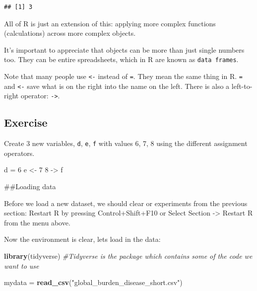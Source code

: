 \documentclass[]{book}
\makeatletter
\newenvironment{Shaded}{\begin{snugshade}}{\end{snugshade}}
\newcommand{\CommentTok}[1]{\textcolor[rgb]{0.56,0.35,0.01}{\textit{#1}}}
\newcommand{\DecValTok}[1]{\textcolor[rgb]{0.00,0.00,0.81}{#1}}
\newcommand{\KeywordTok}[1]{\textcolor[rgb]{0.13,0.29,0.53}{\textbf{#1}}}
\newcommand{\NormalTok}[1]{#1}
\newcommand{\StringTok}[1]{\textcolor[rgb]{0.31,0.60,0.02}{#1}}
\newenvironment{kframe}{%
\medskip{}
\setlength{\fboxsep}{.8em}
 \def\at@end@of@kframe{}%
 \ifinner\ifhmode%
  \def\at@end@of@kframe{\end{minipage}}%
  \begin{minipage}{\columnwidth}%
 \fi\fi%
 \def\FrameCommand##1{\hskip\@totalleftmargin \hskip-\fboxsep
 \colorbox{shadecolor}{##1}\hskip-\fboxsep
     \hskip-\linewidth \hskip-\@totalleftmargin \hskip\columnwidth}%
 \MakeFramed {\advance\hsize-\width
   \@totalleftmargin\z@ \linewidth\hsize
   \@setminipage}}%
 {\par\unskip\endMakeFramed%
 \at@end@of@kframe}
\renewenvironment{Shaded}{\begin{kframe}}{\end{kframe}}
\theoremstyle{definition}
\theoremstyle{definition}
\theoremstyle{definition}
\theoremstyle{remark}
\makeatother
\begin{document}
\begin{verbatim}
## [1] 3
\end{verbatim}

All of R is just an extension of this: applying more complex functions
(calculations) across more complex objects.

It's important to appreciate that objects can be more than just single
numbers too. They can be entire spreadsheets, which in R are known as
\texttt{data\ frames}.

Note that many people use \texttt{\textless{}-} instead of \texttt{=}.
They mean the same thing in R. \texttt{=} and \texttt{\textless{}-} save
what is on the right into the name on the left. There is also a
left-to-right operator: \texttt{-\textgreater{}}.

\hypertarget{exercise-3}{%
\subsection{Exercise}\label{exercise-3}}

Create 3 new variables, \texttt{d}, \texttt{e}, \texttt{f} with values
6, 7, 8 using the different assignment operators.

\begin{Shaded}
\begin{Highlighting}[]
\NormalTok{d  =}\StringTok{ }\DecValTok{6}
\NormalTok{e <-}\StringTok{ }\DecValTok{7}
\DecValTok{8}\NormalTok{ ->}\StringTok{ }\NormalTok{f}
\end{Highlighting}
\end{Shaded}

\#\#Loading data

Before we load a new dataset, we should clear or experiments from the
previous section: Restart R by pressing Control+Shift+F10 or Select
Section -\textgreater{} Restart R from the menu above.

Now the environment is clear, lets load in the data:

\begin{Shaded}
\begin{Highlighting}[]
\KeywordTok{library}\NormalTok{(tidyverse) }\CommentTok{#Tidyverse is the package which contains some of the code we want to use}

\NormalTok{mydata =}\StringTok{ }\KeywordTok{read_csv}\NormalTok{(}\StringTok{"global_burden_disease_short.csv"}\NormalTok{)}
\end{Highlighting}
\end{Shaded}
\end{document}
